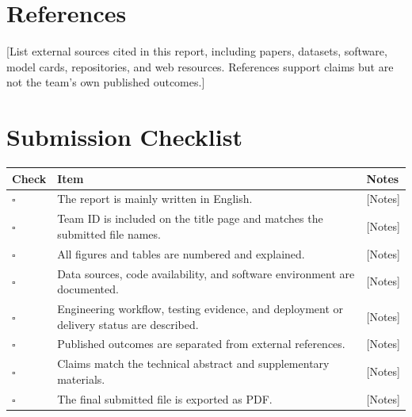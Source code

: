 \documentclass[11pt,a4paper]{article}
\newcommand{\placeholder}[1]{[#1]}
\begin{document}
\section{References}
\placeholder{List external sources cited in this report, including papers, datasets, software, model cards, repositories, and web resources. References support claims but are not the team's own published outcomes.}

\section{Submission Checklist}
\begin{tabularx}{\textwidth}{p{}X X}
\toprule
\textbf{Check} & \textbf{Item} & \textbf{Notes}\\
\midrule
$\square$ & The report is mainly written in English. & \placeholder{Notes}\\
$\square$ & Team ID is included on the title page and matches the submitted file names. & \placeholder{Notes}\\
$\square$ & All figures and tables are numbered and explained. & \placeholder{Notes}\\
$\square$ & Data sources, code availability, and software environment are documented. & \placeholder{Notes}\\
$\square$ & Engineering workflow, testing evidence, and deployment or delivery status are described. & \placeholder{Notes}\\
$\square$ & Published outcomes are separated from external references. & \placeholder{Notes}\\
$\square$ & Claims match the technical abstract and supplementary materials. & \placeholder{Notes}\\
$\square$ & The final submitted file is exported as PDF. & \placeholder{Notes}\\
\bottomrule
\end{tabularx}
\end{document}
